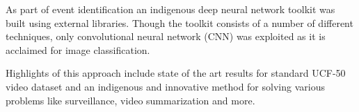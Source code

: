 \par As part of event identification an indigenous deep neural network toolkit was built using external libraries. Though the toolkit consists of a number of different techniques, only convolutional neural network (CNN) was exploited as it is acclaimed for image classification. 

\par Highlights of this approach include state of the art results for standard UCF-50 video dataset and an indigenous and innovative method for solving various problems like surveillance, video summarization and more.  
\pagebreak